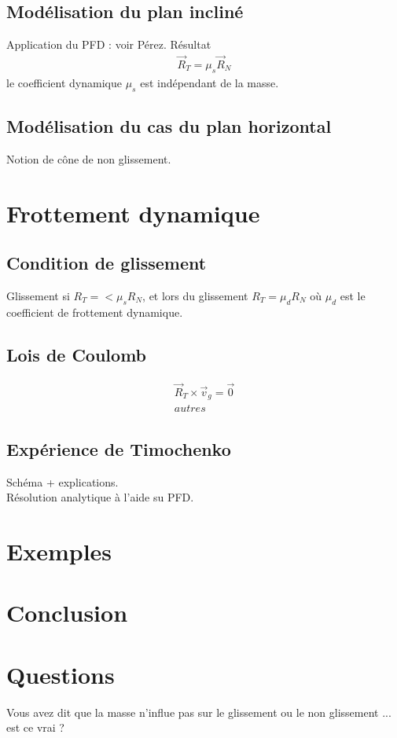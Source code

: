 \documentclass[12pt,prb,aps,epsf]{report}
\begin{document}
\subsection{Modélisation du plan incliné}
Application du PFD : voir Pérez.
Résultat 
\begin{eqnarray}
\vec{R}_T = \mu_s\vec{R}_N
\end{eqnarray}
le coefficient dynamique $\mu_s$ est indépendant de la masse.

\subsection{Modélisation du cas du plan horizontal}
Notion de cône de non glissement.

\section{Frottement dynamique}
\subsection{Condition de glissement}
Glissement si $R_T =< \mu_sR_N$, et lors du glissement $R_T = \mu_dR_N$ où $\mu_d$ est le coefficient de frottement dynamique.

\subsection{Lois de Coulomb}
\begin{eqnarray}
\vec{R}_T \times \vec{v}_g = \vec{0}\\
autres
\end{eqnarray}

\subsection{Expérience de Timochenko}
Schéma + explications.\\
Résolution analytique à l'aide su PFD.

\section{Exemples}
\section{Conclusion}
\section{Questions}
Vous avez dit que la masse n'influe pas sur le glissement ou le non glissement ... est ce vrai ?\\
\end{document}
